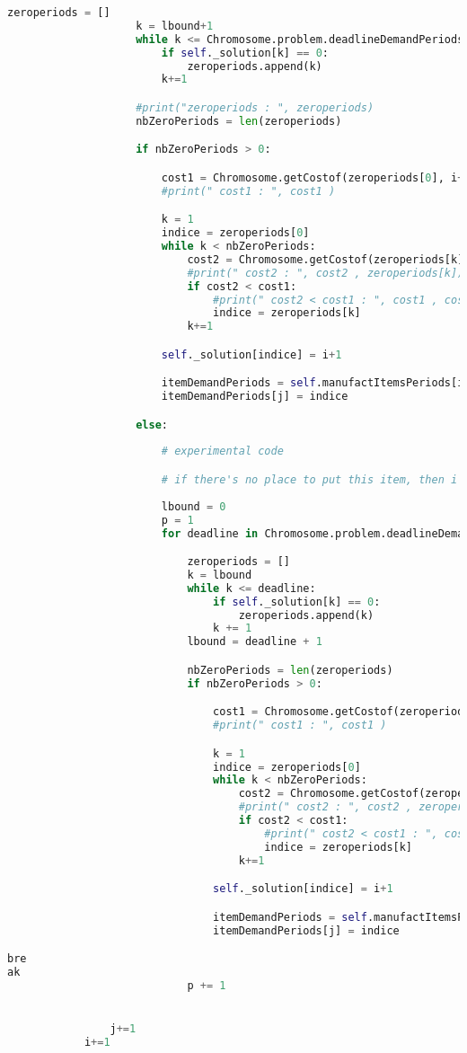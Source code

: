 \begin{lstlisting}[language=python]
					zeroperiods = []
					k = lbound+1
					while k <= Chromosome.problem.deadlineDemandPeriods[i][j]:
						if self._solution[k] == 0:
							zeroperiods.append(k)
						k+=1

					#print("zeroperiods : ", zeroperiods)
					nbZeroPeriods = len(zeroperiods)

					if nbZeroPeriods > 0:

						cost1 = Chromosome.getCostof(zeroperiods[0], i+1, j+1, copy_solution)
						#print(" cost1 : ", cost1 )

						k = 1 
						indice = zeroperiods[0]
						while k < nbZeroPeriods:
							cost2 = Chromosome.getCostof(zeroperiods[k], i+1, j+1, copy_solution)
							#print(" cost2 : ", cost2 , zeroperiods[k])
							if cost2 < cost1:
								#print(" cost2 < cost1 : ", cost1 , cost2 )
								indice = zeroperiods[k]
							k+=1

						self._solution[indice] = i+1

						itemDemandPeriods = self.manufactItemsPeriods[i]
						itemDemandPeriods[j] = indice

					else:
						
						# experimental code 

						# if there's no place to put this item, then i check all the other times in order to put this item there
						
						lbound = 0
						p = 1
						for deadline in Chromosome.problem.deadlineDemandPeriods[i]:

							zeroperiods = []
							k = lbound
							while k <= deadline:
								if self._solution[k] == 0:
									zeroperiods.append(k)
								k += 1
							lbound = deadline + 1

							nbZeroPeriods = len(zeroperiods)
							if nbZeroPeriods > 0:

								cost1 = Chromosome.getCostof(zeroperiods[0], i+1, p, copy_solution)
								#print(" cost1 : ", cost1 )

								k = 1 
								indice = zeroperiods[0]
								while k < nbZeroPeriods:
									cost2 = Chromosome.getCostof(zeroperiods[k], i+1, p, copy_solution)
									#print(" cost2 : ", cost2 , zeroperiods[k])
									if cost2 < cost1:
										#print(" cost2 < cost1 : ", cost1 , cost2 )
										indice = zeroperiods[k]
									k+=1

								self._solution[indice] = i+1

								itemDemandPeriods = self.manufactItemsPeriods[i]
								itemDemandPeriods[j] = indice

bre
ak
							p += 1


				j+=1
			i+=1

    \end{lstlisting}
